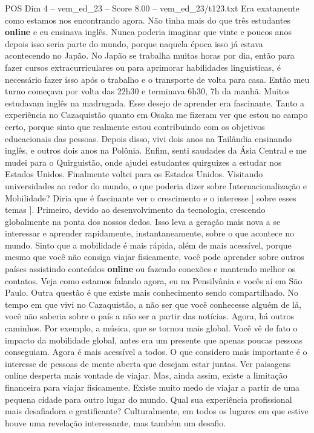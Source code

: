 \begin{textsample}{POS Dim 4 – vem\_ed\_23 – Score 8.00 – vem\_ed\_23/t123.txt}
Era exatamente como estamos nos encontrando agora.
Não tinha mais do que três estudantes \textbf{online} e eu ensinava inglês.
Nunca poderia imaginar que vinte e poucos anos depois isso seria parte do mundo, porque naquela época isso já estava acontecendo no Japão.
No Japão se trabalha muitas horas por dia, então para fazer cursos extracurriculares ou para aprimorar habilidades linguísticas, é necessário fazer isso após o trabalho e o transporte de volta para casa.
Então meu turno começava por volta das 22h30 e terminava 6h30, 7h da manhã.
Muitos estudavam inglês na madrugada.
Esse desejo de aprender era fascinante.
Tanto a experiência no Cazaquistão quanto em Osaka me fizeram ver que estou no campo certo, porque sinto que realmente estou contribuindo com os objetivos educacionais das pessoas.
Depois disso, vivi dois anos na Tailândia ensinando inglês, e outros dois anos na Polônia.
Enfim, senti saudades da Ásia Central e me mudei para o Quirguistão, onde ajudei estudantes quirguizes a estudar nos Estados Unidos.
Finalmente voltei para os Estados Unidos.
Visitando universidades ao redor do mundo, o que poderia dizer sobre Internacionalização e Mobilidade?
Diria que é fascinante ver o crescimento e o interesse [ sobre esses temas ].
Primeiro, devido ao desenvolvimento da tecnologia, crescendo globalmente na ponta dos nossos dedos.
Isso leva a geração mais nova a se interessar e aprender rapidamente, instantaneamente, sobre o que acontece no mundo.
Sinto que a mobilidade é mais rápida, além de mais acessível, porque mesmo que você não consiga viajar fisicamente, você pode aprender sobre outros países assistindo conteúdos \textbf{online} ou fazendo conexões e mantendo melhor os contatos.
Veja como estamos falando agora, eu na Pensilvânia e vocês aí em São Paulo.
Outra questão é que existe mais conhecimento sendo compartilhado.
No tempo em que vivi no Cazaquistão, a não ser que você conhecesse alguém de lá, você não saberia sobre o país a não ser a partir das notícias.
Agora, há outros caminhos.
Por exemplo, a música, que se tornou mais global.
Você vê de fato o impacto da mobilidade global, antes era um presente que apenas poucas pessoas conseguiam.
Agora é mais acessível a todos.
O que considero mais importante é o interesse de pessoas de mente aberta que desejam estar juntas.
Ver paisagens online desperta mais vontade de viajar.
Mas, ainda assim, existe a limitação financeira para viajar fisicamente.
Existe muito medo de viajar a partir de uma pequena cidade para outro lugar do mundo.
Qual sua experiência profissional mais desafiadora e gratificante?
Culturalmente, em todos os lugares em que estive houve uma revelação interessante, mas também um desafio.

\end{textsample}
